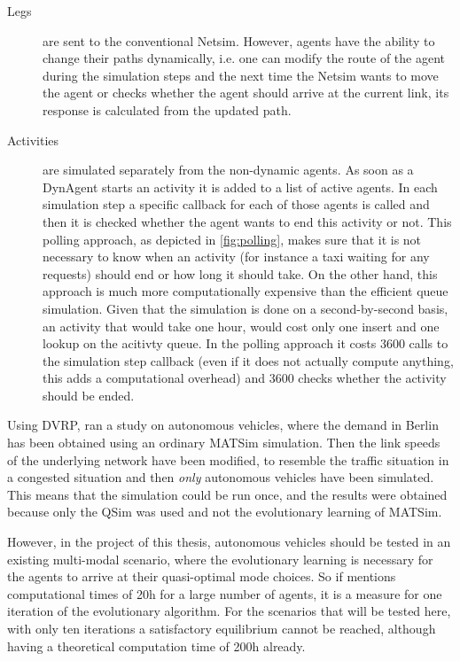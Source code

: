 \begin{description}
\item[Legs] are sent to the conventional Netsim. However, agents have the ability
to change their paths dynamically, i.e. one can modify the route of the agent
during the simulation steps and the next time the Netsim wants to move the agent
or checks whether the agent should arrive at the current link, its response is
calculated from the updated path.
\item[Activities] are simulated separately from the non-dynamic agents. As soon
as a DynAgent starts an activity it is added to a list of active agents. In each
simulation step a specific callback for each of those agents is called and then
it is checked whether the agent wants to end this activity or not.
This polling approach, as depicted in \cref{fig:polling}, makes sure that it is
not necessary to know when an activity (for instance a taxi waiting for any
requests) should end or how long it should take. On the other hand, this approach
is much more computationally expensive than the efficient queue simulation.
Given that the simulation is done on a second-by-second basis, an activity that
would take one hour, would cost only one insert and one lookup on the acitivty queue.
In the polling approach it costs 3600 calls to the simulation step callback (even
if it does not actually compute anything, this adds a computational overhead) and
3600 checks whether the activity should be ended.
\end{description}

Using DVRP, \citet{Bischoff2016} ran a study
on autonomous vehicles, where the demand in Berlin has been
obtained using an ordinary MATSim simulation. Then the link speeds of the underlying
network have been modified, to resemble the traffic situation in a congested
situation and then \textit{only} autonomous vehicles have been simulated. This
means that the simulation could be run once, and the results were obtained because
only the QSim was used and not the evolutionary learning of MATSim.

However, in the project of this thesis, autonomous vehicles should be tested in
an existing multi-modal scenario, where the evolutionary learning is necessary
for the agents to arrive at their quasi-optimal mode choices. So if
\citet{Bischoff2016} mentions computational times of 20h for a large number of agents,
it is a measure for one iteration of the evolutionary algorithm. For the scenarios
that will be tested here, with only ten iterations a satisfactory
equilibrium cannot be reached, although having a theoretical computation time of 200h already.


